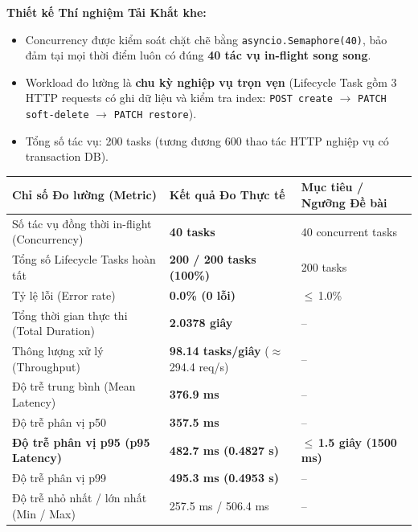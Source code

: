 \documentclass[10pt,a4paper]{article}
\newcommand{\LE}{\ensuremath{\leq}\,}
\newcommand{\hd}[1]{\sffamily\bfseries\scriptsize #1}
\begin{document}
\begin{notebox}
\textbf{Thiết kế Thí nghiệm Tải Khắt khe:}
\begin{itemize}[leftmargin=0.9em,itemsep=0.1pt]
  \item Concurrency được kiểm soát chặt chẽ bằng \texttt{asyncio.Semaphore(40)}, bảo đảm tại mọi thời điểm luôn có đúng \textbf{40 tác vụ in-flight song song}.
  \item Workload đo lường là \textbf{chu kỳ nghiệp vụ trọn vẹn} (Lifecycle Task gồm 3 HTTP requests có ghi dữ liệu và kiểm tra index: \texttt{POST create} $\rightarrow$ \texttt{PATCH soft-delete} $\rightarrow$ \texttt{PATCH restore}).
  \item Tổng số tác vụ: 200 tasks (tương đương 600 thao tác HTTP nghiệp vụ có transaction DB).
\end{itemize}
\end{notebox}

\vspace{0.6pt}
\begin{center}
\scriptsize
\begin{tabularx}{0.96\linewidth}{@{}P{4.8cm}P{3.5cm}Y@{}}
\toprule
{}\hd{Chỉ số Đo lường (Metric)} & \hd{Kết quả Đo Thực tế} & \hd{Mục tiêu / Ngưỡng Đề bài} \\
\midrule
Số tác vụ đồng thời in-flight (Concurrency) & \textbf{40 tasks} & 40 concurrent tasks \\
Tổng số Lifecycle Tasks hoàn tất & \textbf{200 / 200 tasks (100\%)} & 200 tasks \\
Tỷ lệ lỗi (Error rate) & \textbf{0.0\% (0 lỗi)} & \LE 1.0\% \\
Tổng thời gian thực thi (Total Duration) & \textbf{2.0378 giây} & -- \\
Thông lượng xử lý (Throughput) & \textbf{98.14 tasks/giây} ($\approx$ 294.4 req/s) & -- \\
Độ trễ trung bình (Mean Latency) & \textbf{376.9 ms} & -- \\
Độ trễ phân vị p50 & \textbf{357.5 ms} & -- \\
\textbf{Độ trễ phân vị p95 (p95 Latency)} & \textbf{482.7 ms (0.4827 s)} & \textbf{\LE 1.5 giây (1500 ms)} \\
Độ trễ phân vị p99 & \textbf{495.3 ms (0.4953 s)} & -- \\
Độ trễ nhỏ nhất / lớn nhất (Min / Max) & 257.5 ms / 506.4 ms & -- \\
\bottomrule
\end{tabularx}
\end{center}
\end{document}
